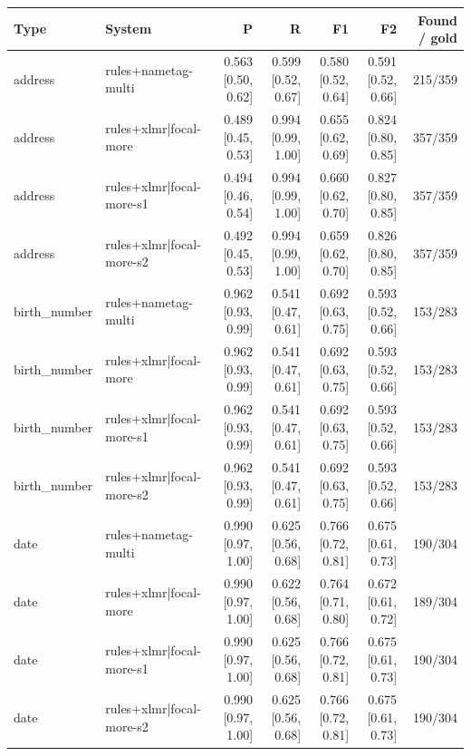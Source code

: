 \providecommand{\ci}[2]{{\scriptsize [#1, #2]}}

\begin{table}[htbp]
\centering
\small
\begin{tabular}{llrrrrr}
\toprule
Type & System & P & R & F1 & F2 & Found / gold \\
\midrule
address & rules+nametag-multi & 0.563 \ci{0.50}{0.62} & 0.599 \ci{0.52}{0.67} & 0.580 \ci{0.52}{0.64} & 0.591 \ci{0.52}{0.66} & 215/359 \\
address & rules+xlmr|focal-more & 0.489 \ci{0.45}{0.53} & 0.994 \ci{0.99}{1.00} & 0.655 \ci{0.62}{0.69} & 0.824 \ci{0.80}{0.85} & 357/359 \\
address & rules+xlmr|focal-more-s1 & 0.494 \ci{0.46}{0.54} & 0.994 \ci{0.99}{1.00} & 0.660 \ci{0.62}{0.70} & 0.827 \ci{0.80}{0.85} & 357/359 \\
address & rules+xlmr|focal-more-s2 & 0.492 \ci{0.45}{0.53} & 0.994 \ci{0.99}{1.00} & 0.659 \ci{0.62}{0.70} & 0.826 \ci{0.80}{0.85} & 357/359 \\
birth\_number & rules+nametag-multi & 0.962 \ci{0.93}{0.99} & 0.541 \ci{0.47}{0.61} & 0.692 \ci{0.63}{0.75} & 0.593 \ci{0.52}{0.66} & 153/283 \\
birth\_number & rules+xlmr|focal-more & 0.962 \ci{0.93}{0.99} & 0.541 \ci{0.47}{0.61} & 0.692 \ci{0.63}{0.75} & 0.593 \ci{0.52}{0.66} & 153/283 \\
birth\_number & rules+xlmr|focal-more-s1 & 0.962 \ci{0.93}{0.99} & 0.541 \ci{0.47}{0.61} & 0.692 \ci{0.63}{0.75} & 0.593 \ci{0.52}{0.66} & 153/283 \\
birth\_number & rules+xlmr|focal-more-s2 & 0.962 \ci{0.93}{0.99} & 0.541 \ci{0.47}{0.61} & 0.692 \ci{0.63}{0.75} & 0.593 \ci{0.52}{0.66} & 153/283 \\
date & rules+nametag-multi & 0.990 \ci{0.97}{1.00} & 0.625 \ci{0.56}{0.68} & 0.766 \ci{0.72}{0.81} & 0.675 \ci{0.61}{0.73} & 190/304 \\
date & rules+xlmr|focal-more & 0.990 \ci{0.97}{1.00} & 0.622 \ci{0.56}{0.68} & 0.764 \ci{0.71}{0.80} & 0.672 \ci{0.61}{0.72} & 189/304 \\
date & rules+xlmr|focal-more-s1 & 0.990 \ci{0.97}{1.00} & 0.625 \ci{0.56}{0.68} & 0.766 \ci{0.72}{0.81} & 0.675 \ci{0.61}{0.73} & 190/304 \\
date & rules+xlmr|focal-more-s2 & 0.990 \ci{0.97}{1.00} & 0.625 \ci{0.56}{0.68} & 0.766 \ci{0.72}{0.81} & 0.675 \ci{0.61}{0.73} & 190/304 \\

\end{tabular}
\end{table}
